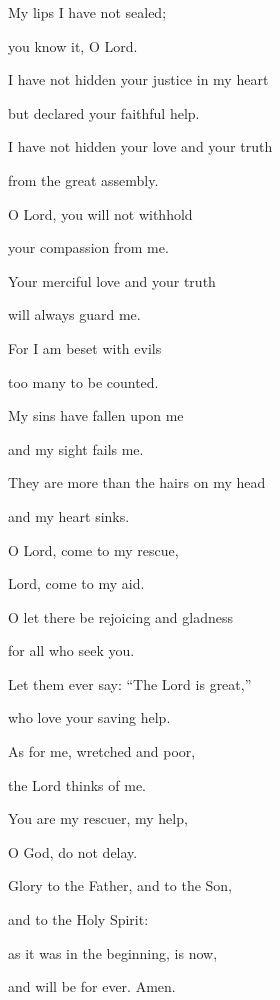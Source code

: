 \noindent My lips I have not sealed;~\GreStar{}~\nopagebreak

you know it, O Lord.

\noindent I have not hidden your justice in my heart~\GreStar{}~\nopagebreak

but declared your faithful help.

\noindent I have not hidden your love and your truth~\GreStar{}~\nopagebreak

from the great assembly.

\noindent O Lord, you will not withhold~\GreStar{}~\nopagebreak

your compassion from me.

\noindent Your merciful love and your truth~\GreStar{}~\nopagebreak

will always guard me.

\noindent For I am beset with evils~\GreStar{}~\nopagebreak

too many to be counted.

\noindent My sins have fallen upon me~\GreStar{}~\nopagebreak

and my sight fails me.

\noindent They are more than the hairs on my head~\GreStar{}~\nopagebreak

and my heart sinks.

\noindent O Lord, come to my rescue,~\GreStar{}~\nopagebreak

Lord, come to my aid.

\noindent O let there be rejoicing and gladness~\GreStar{}~\nopagebreak

for all who seek you.

\noindent Let them ever say: “The Lord is great,”~\GreStar{}~\nopagebreak

who love your saving help.

\noindent As for me, wretched and poor,~\GreStar{}~\nopagebreak

the Lord thinks of me.

\noindent You are my rescuer, my help,~\GreStar{}~\nopagebreak

O God, do not delay.

\noindent Glory to the Father, and to the Son,~\GreStar{}~\nopagebreak

and to the Holy Spirit:

\noindent as it was in the beginning, is now,~\GreStar{}~\nopagebreak

and will be for ever. Amen.